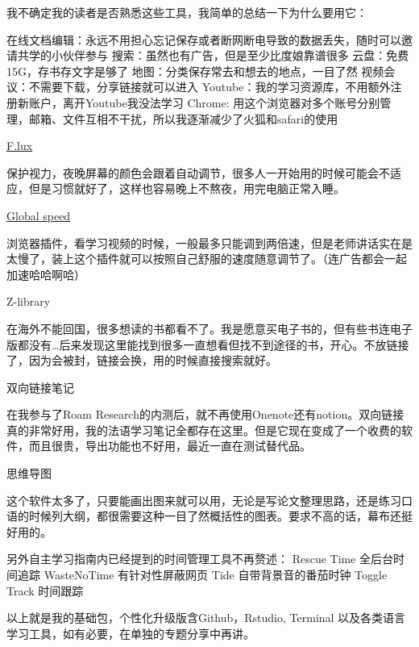 \documentclass[
]{book}
\begin{document}
我不确定我的读者是否熟悉这些工具，我简单的总结一下为什么要用它：

在线文档编辑：永远不用担心忘记保存或者断网断电导致的数据丢失，随时可以邀请共学的小伙伴参与
搜索：虽然也有广告，但是至少比度娘靠谱很多
云盘：免费15G，存书存文字是够了
地图：分类保存常去和想去的地点，一目了然
视频会议：不需要下载，分享链接就可以进入
Youtube：我的学习资源库，不用额外注册新账户，离开Youtube我没法学习
Chrome: 用这个浏览器对多个账号分别管理，邮箱、文件互相不干扰，所以我逐渐减少了火狐和safari的使用

\href{https://justgetflux.com/}{F.lux}

保护视力，夜晚屏幕的颜色会跟着自动调节，很多人一开始用的时候可能会不适应，但是习惯就好了，这样也容易晚上不熬夜，用完电脑正常入睡。

\href{https://github.com/polywock/globalSpeed}{Global speed}

浏览器插件，看学习视频的时候，一般最多只能调到两倍速，但是老师讲话实在是太慢了，装上这个插件就可以按照自己舒服的速度随意调节了。（连广告都会一起加速哈哈啊哈）

Z-library

在海外不能回国，很多想读的书都看不了。我是愿意买电子书的，但有些书连电子版都没有\ldots 后来发现这里能找到很多一直想看但找不到途径的书，开心。不放链接了，因为会被封，链接会换，用的时候直接搜索就好。

双向链接笔记

在我参与了Roam Research的内测后，就不再使用Onenote还有notion。双向链接真的非常好用，我的法语学习笔记全都存在这里。但是它现在变成了一个收费的软件，而且很贵，导出功能也不好用，最近一直在测试替代品。

思维导图

这个软件太多了，只要能画出图来就可以用，无论是写论文整理思路，还是练习口语的时候列大纲，都很需要这种一目了然概括性的图表。要求不高的话，幕布还挺好用的。

另外自主学习指南内已经提到的时间管理工具不再赘述：
Rescue Time 全后台时间追踪
WasteNoTime 有针对性屏蔽网页
Tide 自带背景音的番茄时钟
Toggle Track 时间跟踪

以上就是我的基础包，个性化升级版含Github，Rstudio, Terminal 以及各类语言学习工具，如有必要，在单独的专题分享中再讲。

  
\end{document}
